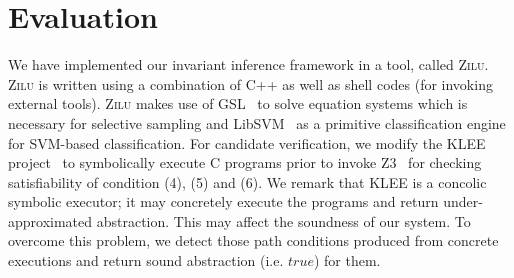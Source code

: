 
\section{Evaluation} %
\label{sec:evaluations}
We have implemented our invariant inference framework in a tool, called \textsc{Zilu}. \textsc{Zilu} is written using a combination of C++ as well as shell codes (for invoking external tools).
\textsc{Zilu} makes use of GSL~\cite{gough2009gnu} to solve equation systems which is necessary for selective sampling and
 LibSVM~\cite{chang2011libsvm} as a primitive classification engine for
SVM-based classification. %
For candidate verification, we %
modify the KLEE project~\cite{cadar2008klee} to
symbolically execute
 C programs %
prior to invoke Z3~\cite{de2008z3} for checking satisfiability of
condition (4), (5) and (6).
 We remark that KLEE is a concolic symbolic executor; it may
concretely execute the programs and return
 under-approximated
abstraction. This may affect the soundness of our system.
To overcome this problem, we detect those path conditions produced from
concrete executions
and return sound abstraction (i.e. $true$) for them.

